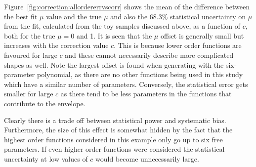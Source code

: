 Figure~\ref{fig:correction:allordererrvscorr} shows the mean of the difference
between the best fit $\mu$ value and the true $\mu$ and also the 68.3\%
statistical uncertainty on $\mu$ from the fit, calculated from the toy
samples discussed above, as a function of $c$,
both for the true $\mu=0$ and 1. It is seen that the $\mu$ offset
is generally small but increases with the correction value $c$. This is
because lower order functions are favoured for large $c$ and these cannot
necessarily describe more complicated shapes as well. Note the largest
offset is found when generating with the six-parameter polynomial, as there
are no other functions being used in this study which have a similar number
of parameters.
Conversely, the
statistical error gets smaller for large $c$ as there tend to be less parameters
in the functions that contribute to the envelope.

Clearly there is a trade off between statistical power and systematic bias. Furthermore, the
size of this effect is somewhat hidden by the fact that the highest order functions considered
in this example only go up to six free parameters. If even higher order functions were considered
the statistical uncertainty at low values of $c$ would become unnecessarily large.

